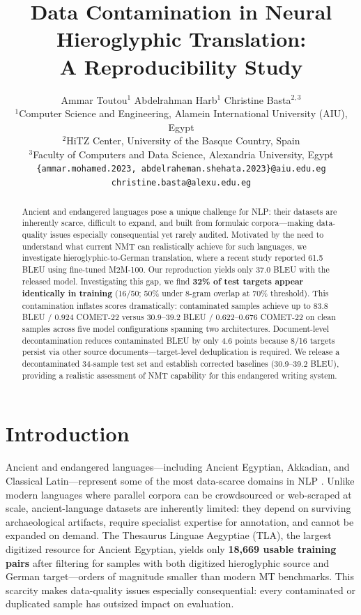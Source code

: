 \documentclass[11pt,a4paper]{article}
\title{Data Contamination in Neural Hieroglyphic Translation:\\A Reproducibility Study}
\author{
  Ammar Toutou$^{1}$ \quad Abdelrahman Harb$^{1}$ \quad Christine Basta$^{2,3}$ \\
  $^{1}$Computer Science and Engineering, Alamein International University (AIU), Egypt \\
  $^{2}$HiTZ Center, University of the Basque Country, Spain \\
  $^{3}$Faculty of Computers and Data Science, Alexandria University, Egypt \\
  \texttt{\{ammar.mohamed.2023, abdelraheman.shehata.2023\}@aiu.edu.eg} \\
  \texttt{christine.basta@alexu.edu.eg}
}
\date{}
\begin{document}
\maketitle

\begin{abstract}

Ancient and endangered languages pose a unique challenge for NLP: their datasets are inherently scarce, difficult to expand, and built from formulaic corpora---making data-quality issues especially consequential yet rarely audited. Motivated by the need to understand what current NMT can realistically achieve for such languages, we investigate hieroglyphic-to-German translation, where a recent study reported 61.5 BLEU using fine-tuned M2M-100. Our reproduction yields only 37.0 BLEU with the released model. Investigating this gap, we find \textbf{32\% of test targets appear identically in training} (16/50; 50\% under 8-gram overlap at 70\% threshold). This contamination inflates scores dramatically: contaminated samples achieve up to 83.8 BLEU / 0.924 COMET-22 versus 30.9--39.2 BLEU / 0.622--0.676 COMET-22 on clean samples across five model configurations spanning two architectures. Document-level decontamination reduces contaminated BLEU by only 4.6 points because 8/16 targets persist via other source documents---target-level deduplication is required. We release a decontaminated 34-sample test set and establish corrected baselines (30.9--39.2 BLEU), providing a realistic assessment of NMT capability for this endangered writing system.

\end{abstract}

\section{Introduction}
\label{sec:intro}

Ancient and endangered languages---including Ancient Egyptian, Akkadian, and Classical Latin---represent some of the most data-scarce domains in NLP \citep{sommerschield2023machine}. Unlike modern languages where parallel corpora can be crowdsourced or web-scraped at scale, ancient-language datasets are inherently limited: they depend on surviving archaeological artifacts, require specialist expertise for annotation, and cannot be expanded on demand. The Thesaurus Linguae Aegyptiae (TLA), the largest digitized resource for Ancient Egyptian, yields only \textbf{18,669 usable training pairs} after filtering for samples with both digitized hieroglyphic source and German target---orders of magnitude smaller than modern MT benchmarks. This scarcity makes data-quality issues especially consequential: every contaminated or duplicated sample has outsized impact on evaluation.
\end{document}
